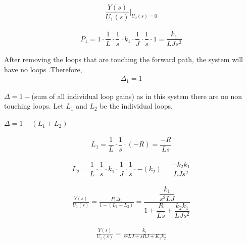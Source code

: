 \begin{enumerate}[label=\thesection.\arabic*.,ref=\thesection.\theenumi]
\begin{itemize}
    
    
\end{itemize}


\begin{align}
\dfrac{Y(s)}{U_1(s)}\Biggr|_{U_2(s)=0}
\end{align}

\begin{align}
P_1=1\cdot\dfrac{1}{L}\cdot\dfrac{1}{s}\cdot k_1 \cdot\dfrac{1}{J}\cdot\dfrac{1}{s}\cdot1=\dfrac{k_1}{LJs^2}
\end{align}

After removing the loops that are touching the forward path, the system will have no loops .Therefore,
\begin{align}
\Delta_1 =1    
\end{align} 



$\Delta= 1 - $(sum of all individual loop gains)
as in this system there are no non touching loops.
Let $L_1$ and $L_2$ be the individual loops.

\centering
$\Delta= 1 - (L_1+L_2)$

\begin{align}
L_1= \dfrac{1}{L}\cdot \dfrac {1}{s}\cdot(-R)=\dfrac{-R}{Ls}
\end{align}


\begin{align}
L_2=\dfrac{1}{L}\cdot \dfrac{1}{s}\cdot k_1 \cdot \dfrac{1}{J} \cdot \dfrac{1}{s}\cdot -(k_2) =\dfrac{-k_2 k_1}{LJs^2}
\end{align}


\begin{align}
\frac{Y(s)}{U_1(s)} = \frac{P_1 \Delta_1}{1-(L_1+L_2)}=\dfrac{\dfrac{k_1}{s^2LJ}}{1+\dfrac{R}{Ls}+\dfrac{k_2 k_1}{LJs^2}}
\end{align}

\centering
\begin{align}
\frac{Y(s)}{U_1(s)}=\frac{k_1}{s^2LJ+sRJ+K_1k_2}
\end{align}


\end{enumerate}